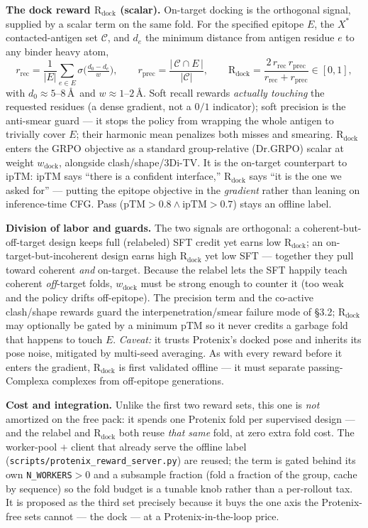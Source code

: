 \documentclass[11pt]{article}
\newcommand{\R}{\mathrm{R}}
\newcommand{\ttk}[1]{\texttt{\small #1}}
\begin{document}
\textbf{The dock reward $\R_{\mathrm{dock}}$ (scalar).} On-target docking is the orthogonal signal,
supplied by a scalar term on the same fold. For the specified epitope $E$, the $X^{\ast}$
contacted-antigen set $\mathcal C$, and $d_e$ the minimum distance from antigen residue $e$ to any
binder heavy atom,
\[
r_{\mathrm{rec}}=\frac1{|E|}\sum_{e\in E}\sigma\!\Big(\tfrac{d_0-d_e}{w}\Big),
\qquad
r_{\mathrm{prec}}=\frac{|\,\mathcal C\cap E\,|}{|\mathcal C|},
\qquad
\R_{\mathrm{dock}}=\frac{2\,r_{\mathrm{rec}}\,r_{\mathrm{prec}}}{r_{\mathrm{rec}}+r_{\mathrm{prec}}}
\in[0,1],
\]
with $d_0\!\approx\!5\text{--}8$\,\AA\ and $w\!\approx\!1\text{--}2$\,\AA. Soft recall rewards
\emph{actually touching} the requested residues (a dense gradient, not a $0/1$ indicator); soft
precision is the anti-smear guard --- it stops the policy from wrapping the whole antigen to trivially
cover $E$; their harmonic mean penalizes both misses and smearing. $\R_{\mathrm{dock}}$ enters the
GRPO objective as a standard group-relative (Dr.GRPO) scalar at weight $w_{\mathrm{dock}}$, alongside
clash/shape/3Di-TV. It is the on-target counterpart to ipTM: ipTM says ``there is a confident
interface,'' $\R_{\mathrm{dock}}$ says ``it is the one we asked for'' --- putting the epitope
objective in the \emph{gradient} rather than leaning on inference-time CFG. Pass
($\text{pTM}\!>\!0.8\wedge\text{ipTM}\!>\!0.7$) stays an offline label.

\textbf{Division of labor and guards.} The two signals are orthogonal: a coherent-but-off-target
design keeps full (relabeled) SFT credit yet earns low $\R_{\mathrm{dock}}$; an
on-target-but-incoherent design earns high $\R_{\mathrm{dock}}$ yet low SFT --- together they pull
toward coherent \emph{and} on-target. Because the relabel lets the SFT happily teach coherent
\emph{off}-target folds, $w_{\mathrm{dock}}$ must be strong enough to counter it (too weak and the
policy drifts off-epitope). The precision term and the co-active clash/shape rewards guard the
interpenetration/smear failure mode of \S3.2; $\R_{\mathrm{dock}}$ may optionally be gated by a
minimum pTM so it never credits a garbage fold that happens to touch $E$. \emph{Caveat:} it trusts
Protenix's docked pose and inherits its pose noise, mitigated by multi-seed averaging. As with every
reward before it enters the gradient, $\R_{\mathrm{dock}}$ is first validated offline --- it must
separate passing-Complexa complexes from off-epitope generations.

\textbf{Cost and integration.} Unlike the first two reward sets, this one is \emph{not} amortized on
the free pack: it spends one Protenix fold per supervised design --- and the relabel and
$\R_{\mathrm{dock}}$ both reuse \emph{that same} fold, at zero extra fold cost. The worker-pool $+$
client that already serve the offline label (\ttk{scripts/protenix\_reward\_server.py}) are reused;
the term is gated behind its own \ttk{N\_WORKERS}$>0$ and a subsample fraction (fold a fraction of the
group, cache by sequence) so the fold budget is a tunable knob rather than a per-rollout tax. It is
proposed as the third set precisely because it buys the one axis the Protenix-free sets cannot --- the
dock --- at a Protenix-in-the-loop price.
\end{document}
